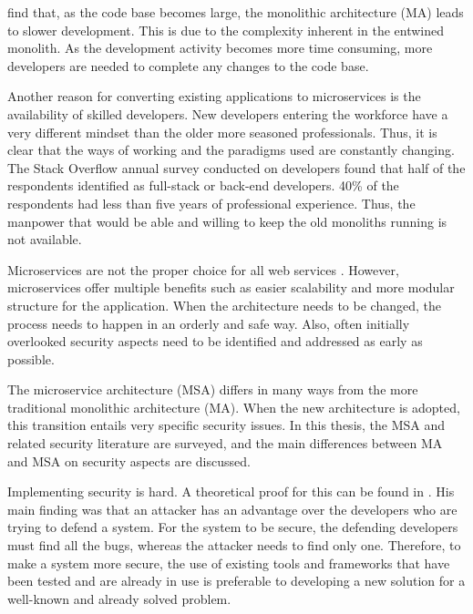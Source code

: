\begin{sloppypar}
    \citet{10.1007/978-3-319-74433-9_3} find that, as the code base becomes
    large, the monolithic architecture (MA) leads to slower development. This is
    due to the complexity inherent in the entwined monolith. As the development
    activity becomes more time consuming, more developers are needed to complete
    any changes to the code base.
\end{sloppypar}
\begin{sloppypar}
    Another reason for converting existing applications to microservices is the
    availability of skilled developers. New developers entering the workforce
    have a very different mindset than the older more seasoned professionals.
    Thus, it is clear that the ways of working and the paradigms used are
    constantly changing. The Stack Overflow annual survey \citep{sosurvey2019}
    conducted on developers found that half of the respondents identified as
    full-stack or back-end developers. 40\% of the respondents had less than
    five years of professional experience. Thus, the manpower that would be able
    and willing to keep the old monoliths running is not available.
\end{sloppypar}
\begin{sloppypar}
    Microservices are not the proper choice for all web services
    \citep{newman2019}. However, microservices offer multiple benefits such as
    easier scalability and more modular structure for the application. When the
    architecture needs to be changed, the process needs to happen in an orderly
    and safe way. Also, often initially overlooked security aspects need to be
    identified and addressed as early as possible.
\end{sloppypar}
\begin{sloppypar}
    The microservice architecture (MSA) differs in many ways from the more
    traditional monolithic architecture (MA). When the new architecture is
    adopted, this transition entails very specific security issues. In this
    thesis, the MSA and related security literature are surveyed, and the main
    differences between MA and MSA on security aspects are discussed.
\end{sloppypar}
\begin{sloppypar}
    Implementing security is hard. A theoretical proof for this can be found in
    \citet{andersson2001information}. His main finding was that an attacker has
    an advantage over the developers who are trying to defend a system. For the
    system to be secure, the defending developers must find all the bugs,
    whereas the attacker needs to find only one. Therefore, to make a system
    more secure, the use of existing tools and frameworks that have been tested
    and are already in use is preferable to developing a new solution for a
    well-known and already solved problem.
\end{sloppypar}
